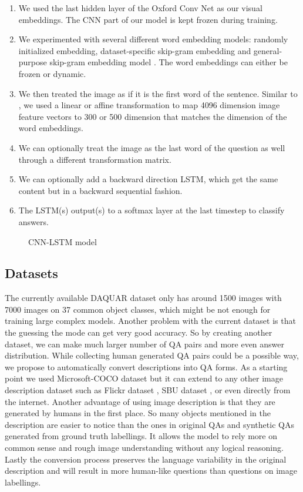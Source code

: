 \documentclass{article}
\renewcommand{\#}[1]{\textbf{#1}}
\begin{document}
\begin{enumerate}
    \item We used the last hidden layer of the Oxford Conv Net \cite{simonyan14} as our visual embeddings. The CNN part of our model is kept frozen during training.
    \item We experimented with several different word embedding models: randomly initialized embedding, dataset-specific skip-gram embedding and general-purpose skip-gram embedding model \cite{mikolov13}. The word embeddings can either be frozen or dynamic.
    \item We then treated the image as if it is the first word of the sentence. Similar to \cite{frome13}, we used a linear or affine transformation to map 4096 dimension image feature vectors to 300 or 500 dimension that matches the dimension of the word embeddings.
    \item We can optionally treat the image as the last word of the question as well through a different transformation matrix.
    \item We can optionally add a backward direction LSTM, which get the same content but in a backward sequential fashion.
    \item The LSTM(s) output(s) to a softmax layer at the last timestep to classify answers.
\end{enumerate}

\begin{figure}
\centering
\scalebox{0.7}{
}
\caption{CNN-LSTM model}
\label{fig:imgword}
\end{figure}

\subsection{Datasets}
The currently available DAQUAR dataset only has around 1500 images with 7000 images on 37 common object classes, which might be not enough for training large complex models. Another problem with the current dataset is that the guessing the mode can get very good accuracy. So by creating another dataset, we can make much larger number of QA pairs and more even answer distribution. While collecting human generated QA pairs could be a possible way, we propose to automatically convert descriptions into QA forms. As a starting point we used Microsoft-COCO dataset \cite{mscoco} but it can extend to any other image description dataset such as Flickr dataset \cite{flickr8k}, SBU dataset \cite{ordonez11}, or even directly from the internet. Another advantage of using image description is that they are generated by humans in the first place. So many objects mentioned in the description are easier to notice than the ones in original QAs and synthetic QAs generated from ground truth labellings. It allows the model to rely more on common sense and rough image understanding without any logical reasoning. Lastly the conversion process preserves the language variability in the original description and will result in more human-like questions than questions on image labellings.
\end{document}

